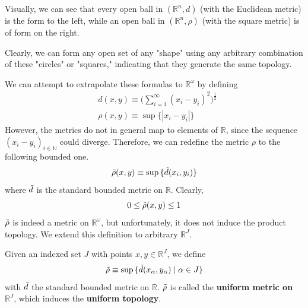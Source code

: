 \documentclass{article}
\begin{document}
  Visually, we can see that every open ball in $(\mathbb{R}^n, d)$ (with the Euclidean metric) is the form to the left, while an open ball in $(\mathbb{R}^n, \rho)$ (with the square metric) is of form on the right. 
  \begin{center}
  \end{center}
  Clearly, we can form any open set of any "shape" using any arbitrary combination of these "circles" or "squares," indicating that they generate the same topology. 

  We can attempt to extrapolate these formulas to $\mathbb{R}^\omega$ by defining
  \begin{align*}
      & d(x, y) \equiv \bigg(\sum_{i=1}^\infty (x_i - y_i)^2 \bigg)^{\frac{1}{2}} \\
      & \rho(x, y) \equiv \sup{\{|x_i - y_i|\}}
  \end{align*}
  However, the metrics do not in general map to elements of $\mathbb{R}$, since the sequence $(x_i - y_i)_{i \in \mathbb{N}}$ could diverge. Therefore, we can redefine the metric $\rho$ to the following bounded one. 
  \[\Tilde{\rho} (x, y) \equiv \sup{\{\Tilde{d}(x_i, y_i)\}}\]
  where $\Tilde{d}$ is the standard bounded metric on $\mathbb{R}$. Clearly,
  \[0 \leq \Tilde{\rho}(x, y) \leq 1\]
  $\Tilde{\rho}$ is indeed a metric on $\mathbb{R}^\omega$, but unfortunately, it does not induce the product topology. We extend this definition to arbitrary $\mathbb{R}^J$. 

  \begin{definition}
  Given an indexed set $J$ with points $x, y \in \mathbb{R}^J$, we define
  \[\Tilde{\rho} \equiv \sup{\{\Tilde{d}(x_\alpha, y_\alpha)\;|\; \alpha \in J\}}\]
  with $\Tilde{d}$ the standard bounded metric on $\mathbb{R}$. $\Tilde{\rho}$ is called the \textbf{uniform metric on $\mathbb{R}^J$}, which induces the \textbf{uniform topology}. 
  \end{definition}
\end{document}
